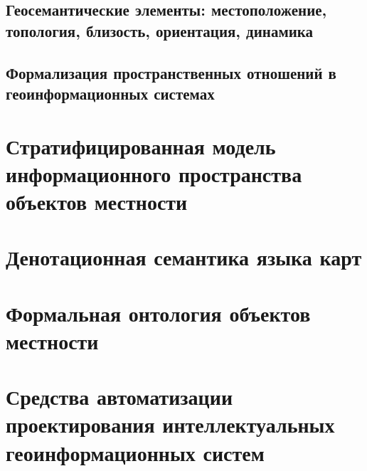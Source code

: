 \subsection{Геосемантические элементы: местоположение, топология, близость, ориентация, динамика}
\subsection{Формализация пространственных отношений в геоинформационных системах}
\section{Стратифицированная модель информационного пространства объектов местности}
\section{Денотационная семантика языка карт}
\section{Формальная онтология объектов местности}
\section{Средства автоматизации проектирования интеллектуальных геоинформационных систем}

